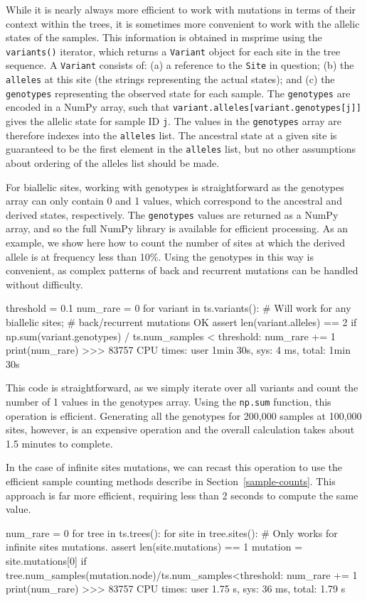 \documentclass[graybox]{svmult}
\begin{document}
While it is nearly always more efficient to work with mutations in terms
of their context within the trees, it is sometimes more convenient to
work with the allelic states of the samples. This information is
obtained in msprime using the \texttt{variants()} iterator, which
returns a \texttt{Variant} object for each site in the tree sequence. A
\texttt{Variant} consists of: (a) a reference to the \texttt{Site} in question;
(b) the \texttt{alleles} at this site (the strings representing the
actual states); and (c) the \texttt{genotypes} representing the observed
state for each sample. The \texttt{genotypes} are encoded in a NumPy
array, such that \texttt{variant.alleles{[}variant.genotypes{[}j{]}{]}}
gives the allelic state for sample ID \texttt{j}. The values in the
\texttt{genotypes} array are therefore indexes into the \texttt{alleles}
list. The ancestral state at a given site is guaranteed to be the first
element in the \texttt{alleles} list, but no other assumptions about
ordering of the alleles list should be made.

For biallelic sites, working with genotypes is straightforward as the
genotypes array can only contain 0 and 1 values, which correspond to
the ancestral and derived states, respectively. The \texttt{genotypes}
values are returned as a NumPy array, and so the full NumPy library is
available for efficient processing. As an example, we show here how to
count the number of sites at which the derived allele is at frequency
less than 10\%. Using the genotypes in this way is convenient, as
complex patterns of back and recurrent mutations can be handled without
difficulty.

\begin{pythoncode}
threshold = 0.1
num_rare = 0
for variant in ts.variants():
    # Will work for any biallelic sites;
    # back/recurrent mutations OK
    assert len(variant.alleles) == 2
    if np.sum(variant.genotypes) / ts.num_samples < threshold:
        num_rare += 1
print(num_rare)
>>> 83757
CPU times: user 1min 30s, sys: 4 ms, total: 1min 30s
\end{pythoncode}

This code is straightforward, as we simply iterate over all variants and
count the number of 1 values in the genotypes array. Using the \texttt{np.sum}
function, this operation is efficient. Generating all the genotypes for
200,000 samples at 100,000 sites, however,
is an expensive operation and the overall calculation takes about 1.5 minutes
to complete.

In the case of infinite sites mutations, we can recast this operation
to use the efficient sample counting methods describe in
Section~\ref{sample-counts}. This approach is far more
efficient, requiring less than 2 seconds to compute the same value.
\begin{pythoncode}
num_rare = 0
for tree in ts.trees():
  for site in tree.sites():
    # Only works for infinite sites mutations.
    assert len(site.mutations) == 1
    mutation = site.mutations[0]
    if tree.num_samples(mutation.node)/ts.num_samples<threshold:
        num_rare += 1
print(num_rare)
>>> 83757
CPU times: user 1.75 s, sys: 36 ms, total: 1.79 s
\end{pythoncode}
\end{document}
